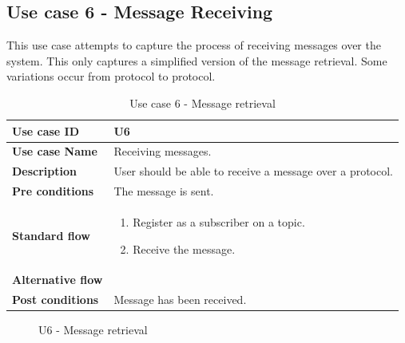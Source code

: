 \clearpage

\subsection{Use case 6 - Message Receiving}
\label{subsec:requirements_engineering-use_cases-message_recieving}

This use case attempts to capture the process of receiving messages over the system. This only captures a simplified version of the message retrieval. Some variations occur from protocol to protocol.

\begin{table}[ht!]
\centering
\begin{tabular}{|l|p{5cm}|}
\hline
\textbf{Use case ID} & U6 \\ \hline
\textbf{Use case Name} & Receiving messages. \\ \hline
\textbf{Description} & User should be able to receive a message over a protocol.  \\ \hline
\textbf{Pre conditions} & The message is sent. \\ \hline
\textbf{Standard flow} & \begin{enumerate}
\item Register as a subscriber on a topic.
\item Receive the message.
\end{enumerate} \\ \hline
\textbf{Alternative flow} & \\ \hline
\textbf{Post conditions} & Message has been received.  \\ \hline
\end{tabular}
\caption{Use case 6 - Message retrieval}
\label{uc6}
\end{table}

\begin{center}
  \begin{figure}[ht!]
    \caption{U6 - Message retrieval}
    \label{fig:u6}
  \end{figure}
\end{center}
\clearpage

